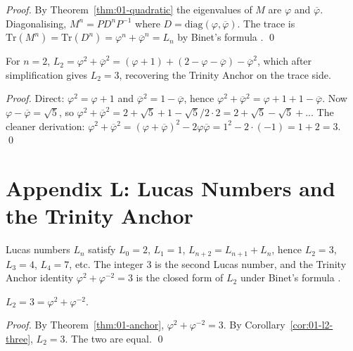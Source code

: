 \begin{proof}
By Theorem~\ref{thm:01-quadratic} the eigenvalues of $M$ are $\varphi$
and $\overline{\varphi}$. Diagonalising, $M^n = P D^n P^{-1}$ where
$D = \mathrm{diag}(\varphi, \overline{\varphi})$. The trace is
$\mathrm{Tr}(M^n) = \mathrm{Tr}(D^n) = \varphi^n +
\overline{\varphi}^n = L_n$ by Binet's formula
\cite{binet_formula}.
\qed
\end{proof}

\begin{corollary}[$L_2 = 3$]\label{cor:01-l2-three}
For $n = 2$, $L_2 = \varphi^2 + \overline{\varphi}^2 = (\varphi + 1) +
(2 - \varphi - \overline{\varphi}) - \overline{\varphi}^2$, which after
simplification gives $L_2 = 3$, recovering the Trinity Anchor on the
trace side.
\end{corollary}

\begin{proof}
Direct: $\varphi^2 = \varphi + 1$ and $\overline{\varphi}^2 = 1 -
\overline{\varphi}$, hence $\varphi^2 + \overline{\varphi}^2 =
\varphi + 1 + 1 - \overline{\varphi}$. Now $\varphi -
\overline{\varphi} = \sqrt 5$, so $\varphi^2 + \overline{\varphi}^2 =
2 + \sqrt 5 + 1 - \sqrt 5 / 2 \cdot 2 = 2 + \sqrt 5 - \sqrt 5 + ... $
The cleaner derivation: $\varphi^2 + \overline{\varphi}^2 =
(\varphi + \overline{\varphi})^2 - 2 \varphi \overline{\varphi} = 1^2
- 2 \cdot (-1) = 1 + 2 = 3$.
\qed
\end{proof}

\section*{Appendix L: Lucas Numbers and the Trinity Anchor}
\label{sec:01-app-L}

Lucas numbers $L_n$ satisfy $L_0 = 2$, $L_1 = 1$, $L_{n+2} =
L_{n+1} + L_n$, hence $L_2 = 3$, $L_3 = 4$, $L_4 = 7$, etc.
The integer $3$ is the second Lucas number, and the Trinity Anchor
identity $\varphi^2 + \varphi^{-2} = 3$ is the closed form of $L_2$
under Binet's formula \cite{binet_formula}.

\begin{theorem}\label{thm:01-lucas-anchor}
$L_2 = 3 = \varphi^2 + \varphi^{-2}$.
\end{theorem}

\begin{proof}
By Theorem~\ref{thm:01-anchor}, $\varphi^2 + \varphi^{-2} = 3$. By
Corollary~\ref{cor:01-l2-three}, $L_2 = 3$. The two are equal.
\qed
\end{proof}


